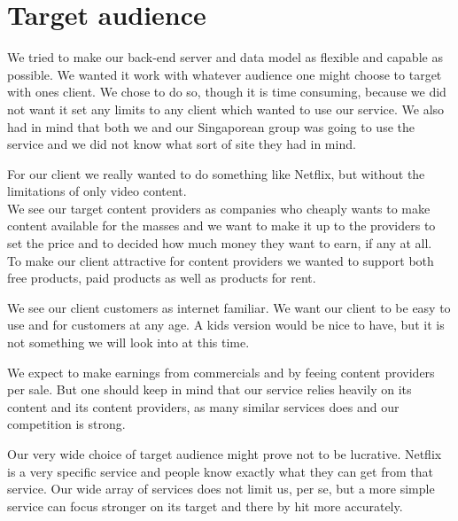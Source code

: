 \section{Target audience}
We tried to make our back-end server and data model as flexible and capable as possible. We wanted it work with whatever audience one might choose to target with ones client. We chose to do so, though it is time consuming, because we did not want it set any limits to any client which wanted to use our service. We also had in mind that both we and our Singaporean group was going to use the service and we did not know what sort of site they had in mind.

For our client we really wanted to do something like Netflix, but without the limitations of only video content. 
\\We see our target content providers as companies who cheaply wants to make content available for the masses and we want to make it up to the providers to set the price and to decided how much money they want to earn, if any at all.
\\To make our client attractive for content providers we wanted to support both free products, paid products as well as products for rent. 

We see our client customers as internet familiar. We want our client to be easy to use and for customers at any age. A kids version would be nice to have, but it is not something we will look into at this time.

We expect to make earnings from commercials and by feeing content providers per sale. But one should keep in mind that our service relies heavily on its content and its content providers, as many similar services does and our competition is strong.

Our very wide choice of target audience might prove not to be lucrative. Netflix is a very specific service and people know exactly what they can get from that service. Our wide array of services does not limit us, per se, but a more simple service can focus stronger on its target and there by hit more accurately.
\newpage
